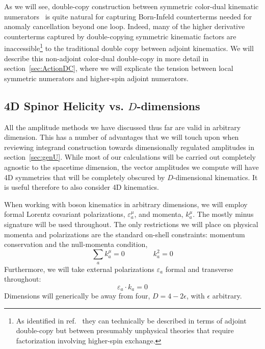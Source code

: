 \documentclass[11pt,letter]{article}
\def\sect#1{section~\ref{#1}}
\begin{document}
As we will see,  double-copy construction between symmetric color-dual kinematic numerators~\cite{Carrasco:2022jxn} is quite natural for capturing Born-Infeld counterterms needed for anomaly cancellation beyond one loop. Indeed, many of the higher derivative counterterms captured by double-copying symmetric kinematic factors are inaccessible\footnote{As identified in ref.~\cite{Carrasco:2022jxn} they can technically be described in terms of adjoint double-copy but between presumably unphysical theories that require factorization involving higher-spin exchange.} to the traditional double copy between adjoint kinematics. We will describe this non-adjoint color-dual double-copy in more detail in \sect{sec:ActionDC}, where we will explicate the tension between local symmetric numerators and higher-spin adjoint numerators. 


\subsection{4D Spinor Helicity vs. $D$-dimensions}
\label{subsec:4DandDDReview}
All the amplitude methods we have discussed thus far are valid in arbitrary dimension. This has a number of advantages that we will touch upon when reviewing integrand construction towards dimensionally regulated amplitudes in \sect{sec:genU}. While most of our calculations will be carried out completely agnostic to the spacetime dimension, the vector amplitudes we compute will have 4D symmetries that will be completely obscured by $D$-dimensional kinematics. It is useful therefore to also consider 4D kinematics. 

When working with boson kinematics in arbitrary dimensions, we will employ formal Lorentz covariant polarizations, $\varepsilon^\mu_a$, and momenta, $k^\mu_a$. The mostly minus signature will be used throughout. The only restrictions we will place on physical momenta and polarizations are the standard on-shell constraints: momentum conservation and the null-momenta condition,
\begin{equation}
\sum_{a} k_a^\mu =0 \qquad \qquad k_a^2 =0
\end{equation}
Furthermore, we will take external polarizations $\varepsilon_a$ formal and transverse throughout:
\begin{equation}
\varepsilon_a \cdot k_a = 0
\end{equation}
Dimensions will generically be away from four, $D=4-2\epsilon$, with $\epsilon$ arbitrary. 
\end{document}
